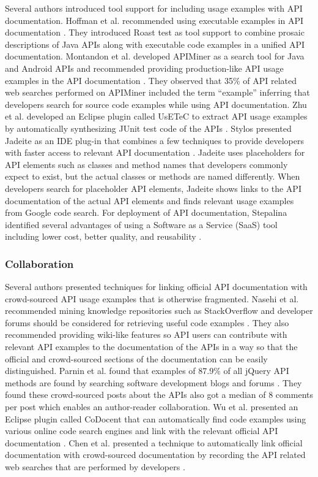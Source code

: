 \documentclass[11pt,oneside]{book}
\begin{document}
Several authors introduced tool support for including usage examples with API documentation. Hoffman et al. recommended using executable examples in API documentation \cite{Hoffman_api_documentation}. They introduced Roast test as tool support  to combine prosaic descriptions of Java APIs along with executable code examples in a unified API documentation. Montandon et al. developed APIMiner as a search tool for Java and Android APIs and recommended providing production-like API usage examples in the API documentation \cite{montandon2013documenting}. They observed that 35\% of API related web searches performed on APIMiner included the term “example” inferring that developers search for source code examples while using API documentation. Zhu et al. developed an Eclipse plugin called UsETeC to extract API usage examples by automatically synthesizing JUnit test code of the APIs \cite{zhu2014mining}. Stylos presented Jadeite as an IDE plug-in that combines a few techniques to provide developers with faster access to relevant API documentation \cite{Jadeite}. Jadeite uses placeholders for API elements such as classes and method names that developers commonly expect to exist, but the actual classes or methods are named differently. When developers search for placeholder API elements, Jadeite shows links to the API documentation of the actual API elements and finds relevant usage examples from Google code search. For deployment of API documentation, Stepalina identified several advantages of using a Software as a Service (SaaS) tool including lower cost, better quality, and reusability \cite{Stepalina_saas}.


\subsubsection{Collaboration} %


Several authors presented techniques for linking official API documentation with crowd-sourced API usage examples that is otherwise fragmented. Nasehi et al. recommended mining knowledge repositories such as StackOverflow and developer forums should be considered for retrieving useful code examples \cite{Nasehi_what_makes}. They also recommended providing wiki-like features so API users can contribute with relevant API examples to the documentation of the APIs in a way so that the official and crowd-sourced sections of the documentation can be easily distinguished. Parnin et al. found that examples of 87.9\% of all jQuery API methods are found by searching software development blogs and forums \cite{Parnin_measuring}. They found these crowd-sourced posts about the APIs also got a median of 8 comments per post which enables an author-reader collaboration. Wu et al. presented an Eclipse plugin called CoDocent that can automatically find code examples using various online code search engines and link with the relevant official API documentation \cite{wu2010codocent}. Chen et al. presented a technique to automatically link official documentation with crowd-sourced documentation by recording the API related web searches that are performed by developers \cite{Chen_who_asked}.
\end{document}
